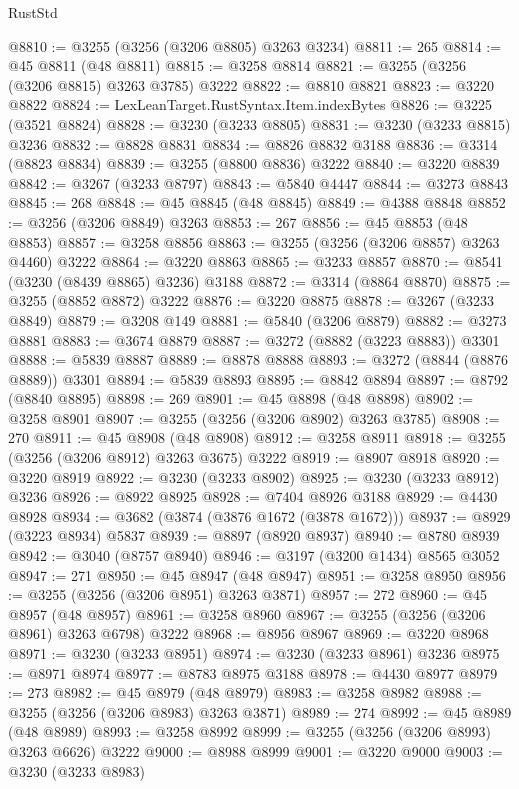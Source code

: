 \begin{lexlean}{RustStd}
\begin{coremodule}
@8810 := @3255 (@3256 (@3206 @8805) @3263 @3234)
@8811 := 265
@8814 := @45 @8811 (@48 @8811)
@8815 := @3258 @8814
@8821 := @3255 (@3256 (@3206 @8815) @3263 @3785) @3222
@8822 := @8810 @8821
@8823 := @3220 @8822
@8824 := LexLeanTarget.RustSyntax.Item.indexBytes
@8826 := @3225 (@3521 @8824)
@8828 := @3230 (@3233 @8805)
@8831 := @3230 (@3233 @8815) @3236
@8832 := @8828 @8831
@8834 := @8826 @8832 @3188
@8836 := @3314 (@8823 @8834)
@8839 := @3255 (@8800 @8836) @3222
@8840 := @3220 @8839
@8842 := @3267 (@3233 @8797)
@8843 := @5840 @4447
@8844 := @3273 @8843
@8845 := 268
@8848 := @45 @8845 (@48 @8845)
@8849 := @4388 @8848
@8852 := @3256 (@3206 @8849) @3263
@8853 := 267
@8856 := @45 @8853 (@48 @8853)
@8857 := @3258 @8856
@8863 := @3255 (@3256 (@3206 @8857) @3263 @4460) @3222
@8864 := @3220 @8863
@8865 := @3233 @8857
@8870 := @8541 (@3230 (@8439 @8865) @3236) @3188
@8872 := @3314 (@8864 @8870)
@8875 := @3255 (@8852 @8872) @3222
@8876 := @3220 @8875
@8878 := @3267 (@3233 @8849)
@8879 := @3208 @149
@8881 := @5840 (@3206 @8879)
@8882 := @3273 @8881
@8883 := @3674 @8879
@8887 := @3272 (@8882 (@3223 @8883)) @3301
@8888 := @5839 @8887
@8889 := @8878 @8888
@8893 := @3272 (@8844 (@8876 @8889)) @3301
@8894 := @5839 @8893
@8895 := @8842 @8894
@8897 := @8792 (@8840 @8895)
@8898 := 269
@8901 := @45 @8898 (@48 @8898)
@8902 := @3258 @8901
@8907 := @3255 (@3256 (@3206 @8902) @3263 @3785)
@8908 := 270
@8911 := @45 @8908 (@48 @8908)
@8912 := @3258 @8911
@8918 := @3255 (@3256 (@3206 @8912) @3263 @3675) @3222
@8919 := @8907 @8918
@8920 := @3220 @8919
@8922 := @3230 (@3233 @8902)
@8925 := @3230 (@3233 @8912) @3236
@8926 := @8922 @8925
@8928 := @7404 @8926 @3188
@8929 := @4430 @8928
@8934 := @3682 (@3874 (@3876 @1672 (@3878 @1672)))
@8937 := @8929 (@3223 @8934) @5837
@8939 := @8897 (@8920 @8937)
@8940 := @8780 @8939
@8942 := @3040 (@8757 @8940)
@8946 := @3197 (@3200 @1434) @8565 @3052
@8947 := 271
@8950 := @45 @8947 (@48 @8947)
@8951 := @3258 @8950
@8956 := @3255 (@3256 (@3206 @8951) @3263 @3871)
@8957 := 272
@8960 := @45 @8957 (@48 @8957)
@8961 := @3258 @8960
@8967 := @3255 (@3256 (@3206 @8961) @3263 @6798) @3222
@8968 := @8956 @8967
@8969 := @3220 @8968
@8971 := @3230 (@3233 @8951)
@8974 := @3230 (@3233 @8961) @3236
@8975 := @8971 @8974
@8977 := @8783 @8975 @3188
@8978 := @4430 @8977
@8979 := 273
@8982 := @45 @8979 (@48 @8979)
@8983 := @3258 @8982
@8988 := @3255 (@3256 (@3206 @8983) @3263 @3871)
@8989 := 274
@8992 := @45 @8989 (@48 @8989)
@8993 := @3258 @8992
@8999 := @3255 (@3256 (@3206 @8993) @3263 @6626) @3222
@9000 := @8988 @8999
@9001 := @3220 @9000
@9003 := @3230 (@3233 @8983)

\end{coremodule}
\end{lexlean}
